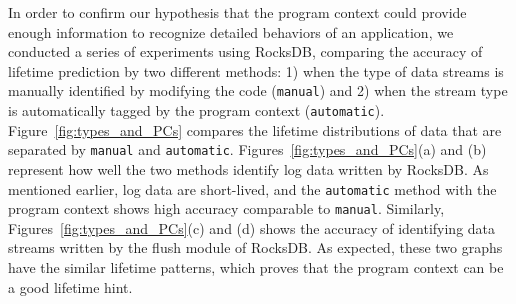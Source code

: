 In order to confirm our hypothesis that the program context could provide
enough information to recognize detailed behaviors of an application, we
conducted a series of experiments using RocksDB, comparing the accuracy of
lifetime prediction by two different methods: 1) when the type of data streams
is manually identified by modifying the code (\texttt{manual}) and 2) when the
stream type is automatically tagged by the program context
(\texttt{automatic}).  Figure~\ref{fig:types_and_PCs} compares the lifetime
distributions of data that are separated by \texttt{manual} and
\texttt{automatic}.  Figures~\ref{fig:types_and_PCs}(a) and (b) represent how
well the two methods identify log data written by
RocksDB.  As mentioned earlier, log data are short-lived, and the
\texttt{automatic} method with the program context shows high accuracy
comparable to \texttt{manual}. Similarly, Figures~\ref{fig:types_and_PCs}(c)
and (d) shows the accuracy of identifying data streams written by the flush
module of RocksDB.  As expected, these two graphs have the similar lifetime
patterns, which proves that the program context can be a good lifetime hint.


